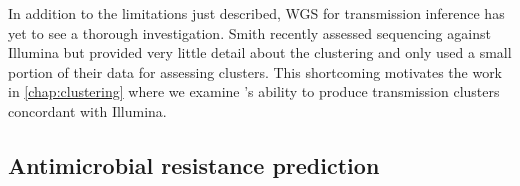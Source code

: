 In addition to the limitations just described, \ont{} WGS for transmission inference has yet to see a thorough investigation. Smith \etal{} recently assessed \ont{} sequencing against Illumina but provided very little detail about the clustering and only used a small portion of their data for assessing clusters. This shortcoming motivates the work in \autoref{chap:clustering} where we examine \ont{}'s ability to produce transmission clusters concordant with Illumina.

\subsection{Antimicrobial resistance prediction}




